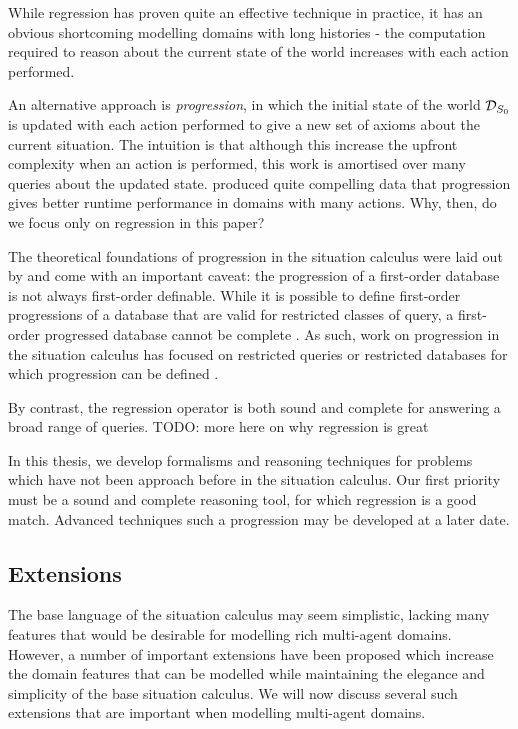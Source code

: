 While regression has proven quite an effective technique in practice,
it has an obvious shortcoming modelling domains with long histories
- the computation required to reason about the current state of the
world increases with each action performed.

An alternative approach is \emph{progression}, in which the initial
state of the world $\mathcal{D}_{S_{0}}$ is updated with each action performed
to give a new set of axioms about the current situation. The intuition
is that although this increase the upfront complexity when an action
is performed, this work is amortised over many queries about the updated
state. \citet{thielscher04case_for_progression} produced quite compelling
data that progression gives better runtime performance in domains
with many actions. Why, then, do we focus only on regression in this
paper?

The theoretical foundations of progression in the situation calculus
were laid out by \citet{reiter97progression} and come with an important
caveat: the progression of a first-order database is not always first-order
definable. While it is possible to define first-order progressions
of a database that are valid for restricted classes of query, a first-order
progressed database cannot be complete \citep{vassos08progression_future_queries}.
As such, work on progression in the situation calculus has focused
on restricted queries or restricted databases for which progression
can be defined \citep{liu05sc_progression_knowledge,vassos07progression}.

By contrast, the regression operator is both sound and complete for
answering a broad range of queries. TODO: more here on why regression
is great

In this thesis, we develop formalisms and reasoning techniques for
problems which have not been approach before in the situation calculus.
Our first priority must be a sound and complete reasoning tool, for
which regression is a good match. Advanced techniques such a progression
may be developed at a later date.


\subsection{Extensions}

The base language of the situation calculus may seem simplistic, lacking
many features that would be desirable for modelling rich multi-agent
domains. However, a number of important extensions have been proposed
which increase the domain features that can be modelled while maintaining
the elegance and simplicity of the base situation calculus. We will
now discuss several such extensions that are important when modelling
multi-agent domains.


